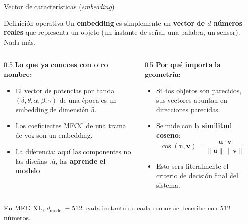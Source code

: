 \documentclass[aspectratio=169,10pt]{beamer}
\newcommand{\term}[1]{\textbf{\color{deepgreen}#1}}
\newcommand{\eng}[1]{{\itshape\color{muted}#1}}
\begin{document}
\begin{frame}[c]{Vector de características (\eng{embedding})}
  \small
  \begin{block}{Definición operativa}
    Un \term{embedding} es simplemente un \term{vector de $d$ números reales} que representa un objeto (un instante de señal, una palabra, un sensor). Nada más.
  \end{block}
  \vspace{2mm}
  \begin{columns}[t,totalwidth=\linewidth]
    \begin{column}{0.5\linewidth}
      \textbf{Lo que ya conoces con otro nombre:}
      \begin{itemize}
        \item El vector de potencias por banda $(\delta,\theta,\alpha,\beta,\gamma)$ de una época es un embedding de dimensión 5.
        \item Los coeficientes MFCC de una trama de voz son un embedding.
        \item La diferencia: aquí las componentes no las diseñas tú, las \term{aprende el modelo}.
      \end{itemize}
    \end{column}
    \begin{column}{0.5\linewidth}
      \textbf{Por qué importa la geometría:}
      \begin{itemize}
        \item Si dos objetos son parecidos, sus vectores apuntan en direcciones parecidas.
        \item Se mide con la \term{similitud coseno}:
        \[ \cos(\mathbf{u},\mathbf{v}) = \frac{\mathbf{u}\cdot\mathbf{v}}{\|\mathbf{u}\|\,\|\mathbf{v}\|} \]
        \item Esto será literalmente el criterio de decisión final del sistema.
      \end{itemize}
    \end{column}
  \end{columns}
  \vspace{2mm}
  \centering
  {\footnotesize En MEG-XL, $d_{\text{model}} = 512$: cada instante de cada sensor se describe con 512 números.}
\end{frame}
\end{document}
